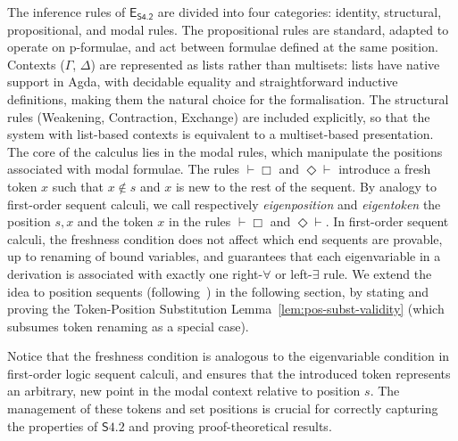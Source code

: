 \documentclass{article}
\newcommand{\logic}{\mathsf{S4.2}}
\newcommand{\agda}{\textsf{Agda}}
\theoremstyle{definition}
\begin{document}
The inference rules of $\mathsf{E}_{{\textsf{S4.2}}}$ are divided into four categories: identity, structural, propositional, and modal rules. The propositional rules are standard, adapted to operate on p-formulae, and act between formulae defined at the same position. Contexts ($\Gamma$, $\Delta$) are represented as lists rather than multisets: lists have native support in \agda, with decidable equality and straightforward inductive definitions, making them the natural choice for the formalisation. The structural rules (Weakening, Contraction, Exchange) are included explicitly, so that the system with list-based contexts is equivalent to a multiset-based presentation. The core of the calculus lies in the modal rules, which manipulate the positions associated with modal formulae.
The rules $\vdash \Box$ and $\Diamond \vdash$ introduce a fresh token $x$ such that $x \notin s$ and $x$ is new to the rest of the sequent. By analogy to first-order sequent calculi, we call respectively \emph{eigenposition} and \emph{eigentoken} the position $s,x$ and the token $x$ in the rules  $\vdash \Box$ and $\Diamond \vdash$.
In first-order sequent calculi, the freshness condition does not affect which end sequents are provable, up to renaming of bound variables, and guarantees that each eigenvariable in a derivation is associated with exactly one right-$\forall$ or left-$\exists$ rule.
We extend the idea to position sequents (following~\cite{Martini2023:CutElimination}) in the following section, by stating and proving the Token-Position Substitution Lemma~\ref{lem:pos-subst-validity} (which subsumes token renaming as a special case).


 


Notice that the freshness condition is analogous to the eigenvariable condition in first-order logic sequent calculi, and ensures that the introduced token represents an arbitrary, new point in the modal context relative to position $s$. The management of these tokens and set positions is crucial for correctly capturing the properties of $\logic$ and proving proof-theoretical results.
\end{document}
